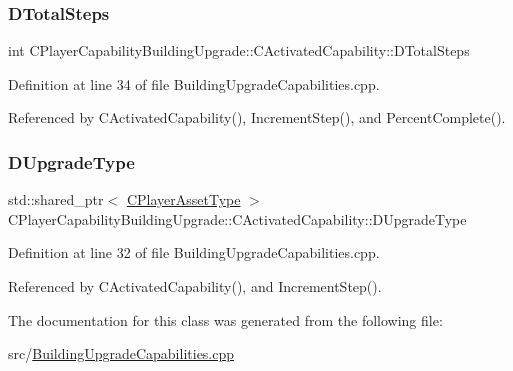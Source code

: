 \subsubsection{\texorpdfstring{D\+Total\+Steps}{DTotalSteps}}
{\footnotesize\ttfamily int C\+Player\+Capability\+Building\+Upgrade\+::\+C\+Activated\+Capability\+::\+D\+Total\+Steps\hspace{0.3cm}{\ttfamily [protected]}}



Definition at line 34 of file Building\+Upgrade\+Capabilities.\+cpp.



Referenced by C\+Activated\+Capability(), Increment\+Step(), and Percent\+Complete().

\hypertarget{classCPlayerCapabilityBuildingUpgrade_1_1CActivatedCapability_a625885c25af00ac23b85f95fc44f897d}{}\label{classCPlayerCapabilityBuildingUpgrade_1_1CActivatedCapability_a625885c25af00ac23b85f95fc44f897d} 
\subsubsection{\texorpdfstring{D\+Upgrade\+Type}{DUpgradeType}}
{\footnotesize\ttfamily std\+::shared\+\_\+ptr$<$ \hyperlink{classCPlayerAssetType}{C\+Player\+Asset\+Type} $>$ C\+Player\+Capability\+Building\+Upgrade\+::\+C\+Activated\+Capability\+::\+D\+Upgrade\+Type\hspace{0.3cm}{\ttfamily [protected]}}



Definition at line 32 of file Building\+Upgrade\+Capabilities.\+cpp.



Referenced by C\+Activated\+Capability(), and Increment\+Step().



The documentation for this class was generated from the following file\+:\begin{DoxyCompactItemize}
\item 
src/\hyperlink{BuildingUpgradeCapabilities_8cpp}{Building\+Upgrade\+Capabilities.\+cpp}\end{DoxyCompactItemize}
